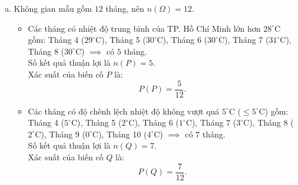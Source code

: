 \begin{bt}
{\begin{enumerate}[a)]
\begin{itemize}
        \item Tháng 10: $28 - 24 = 4^\circ\text{C}$; Tháng 11: $27 - 20 = 7^\circ\text{C}$; Tháng 12: $26 - 17 = 9^\circ\text{C}$.
    \end{itemize}
    Tổng độ chênh lệch nhiệt độ trong $12$ tháng là:
    $$10 + 10 + 8 + 5 + 2 + 1 + 3 + 2 + 0 + 4 + 7 + 9 = 61^\circ\text{C}.$$
    Độ chênh lệch nhiệt độ trung bình là:
    $$\dfrac{61}{12} \approx 5{,}08^\circ\text{C}.$$
    \item Không gian mẫu gồm $12$ tháng, nên $n(\Omega) = 12$.
    \begin{itemize}
        \item Các tháng có nhiệt độ trung bình của TP. Hồ Chí Minh lớn hơn $28^\circ\text{C}$ gồm: Tháng 4 ($29^\circ\text{C}$), Tháng 5 ($30^\circ\text{C}$), Tháng 6 ($30^\circ\text{C}$), Tháng 7 ($31^\circ\text{C}$), Tháng 8 ($30^\circ\text{C}$) $\implies$ có $5$ tháng.\\
        Số kết quả thuận lợi là $n(P) = 5$.\\
        Xác suất của biến cố $P$ là:
        $$P(P) = \dfrac{5}{12}.$$
        \item Các tháng có độ chênh lệch nhiệt độ không vượt quá $5^\circ\text{C}$ ($\le 5^\circ\text{C}$) gồm: Tháng 4 ($5^\circ\text{C}$), Tháng 5 ($2^\circ\text{C}$), Tháng 6 ($1^\circ\text{C}$), Tháng 7 ($3^\circ\text{C}$), Tháng 8 ($2^\circ\text{C}$), Tháng 9 ($0^\circ\text{C}$), Tháng 10 ($4^\circ\text{C}$) $\implies$ có $7$ tháng.\\
        Số kết quả thuận lợi là $n(Q) = 7$.\\
        Xác suất của biến cố $Q$ là:
        $$P(Q) = \dfrac{7}{12}.$$
    \end{itemize}
\end{enumerate}
}
\end{bt}

